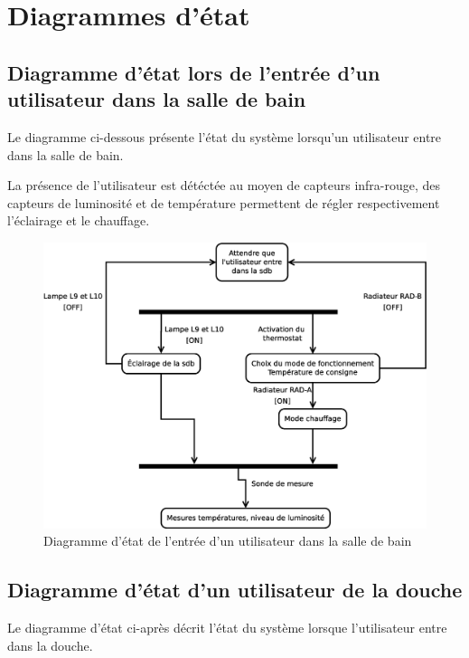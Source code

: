 \chapter{Diagrammes d'état}
\section{Diagramme d'état lors de l'entrée d'un utilisateur dans la salle de bain}
Le diagramme ci-dessous présente l'état du système lorsqu'un utilisateur entre dans la salle de bain.

La présence de l'utilisateur est détéctée au moyen de capteurs infra-rouge, des capteurs de luminosité et de température permettent de régler respectivement l'éclairage et le chauffage.
\begin{figure}[H]
	\centering
	\includegraphics[width=1\linewidth]{diagrams/bathroom/diagramme_etat_st.eps}
	\caption{Diagramme d'état de l'entrée d'un utilisateur dans la salle de bain}
	\label{fig:diagramme_st}
\end{figure}
%
\section{Diagramme d'état d'un utilisateur de la douche}
Le diagramme d'état ci-après décrit l'état du système lorsque l'utilisateur entre dans la douche. 

